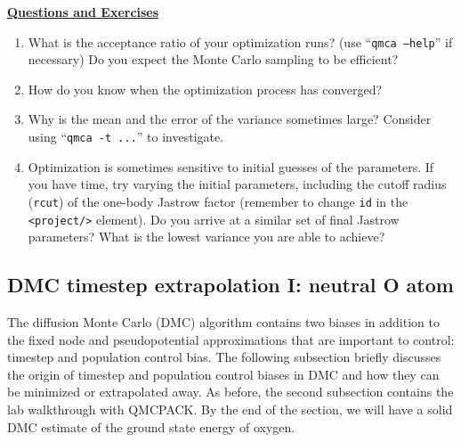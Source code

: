 \vspace{1cm}
\begin{flushleft}
\textbf{\underline{Questions and Exercises}}
\end{flushleft}
\begin{enumerate}
  \item{What is the acceptance ratio of your optimization runs? (use ``\texttt{qmca --help}'' if necessary)  Do you expect the Monte Carlo sampling to be efficient?}
  \item{How do you know when the optimization process has converged?}
  \item{Why is the mean and the error of the variance sometimes large?  Consider using ``\texttt{qmca -t ...}'' to investigate.}
  \item{Optimization is sometimes sensitive to initial guesses of the parameters.  If you have time, try varying the initial parameters, including the cutoff radius (\texttt{rcut}) of the one-body Jastrow factor (remember to change \texttt{id} in the \texttt{<project/>} element).  Do you arrive at a similar set of final Jastrow parameters?  What is the lowest variance you are able to achieve?}
\end{enumerate}



\subsection{DMC timestep extrapolation I: neutral O atom}
The diffusion Monte Carlo (DMC) algorithm contains two biases in addition to the fixed node and pseudopotential approximations that are important to control: timestep and population control bias.  The following subsection briefly discusses the origin of timestep and population control biases in DMC and how they can be minimized or extrapolated away.  As before, the second subsection contains the lab walkthrough with QMCPACK.  By the end of the section, we will have a solid DMC estimate of the ground state energy of oxygen.

